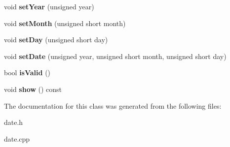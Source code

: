\begin{DoxyCompactItemize}
void {\bfseries set\+Year} (unsigned year)
\item 
\mbox{\label{class_date_a6f2ab890b1935488aaa604b77caac4ae}} 
void {\bfseries set\+Month} (unsigned short month)
\item 
\mbox{\label{class_date_a61e8103c09406f067992e15f36a7f910}} 
void {\bfseries set\+Day} (unsigned short day)
\item 
\mbox{\label{class_date_a8c5fc0dd7ecf3bae6a1de5146fc566e4}} 
void {\bfseries set\+Date} (unsigned year, unsigned short month, unsigned short day)
\item 
\mbox{\label{class_date_a7d9aaa9db591413e21c8b85fdae130ad}} 
bool {\bfseries is\+Valid} ()
\item 
\mbox{\label{class_date_a37f8fc7ca1692df7a8b265099c061721}} 
void {\bfseries show} () const
\end{DoxyCompactItemize}


The documentation for this class was generated from the following files\+:\begin{DoxyCompactItemize}
\item 
date.\+h\item 
date.\+cpp\end{DoxyCompactItemize}
